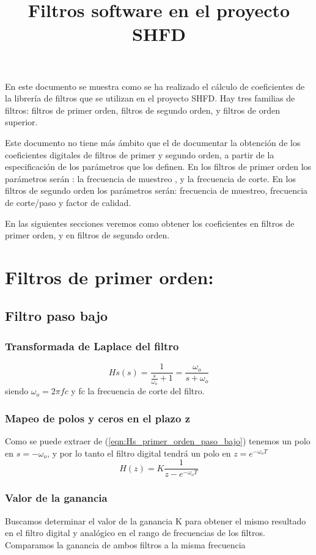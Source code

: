 \documentclass[titlepage]{article}
\title{Filtros software en el proyecto SHFD}
\date{} %
\begin{document}
\maketitle
En este documento se muestra como se ha realizado el cálculo de coeficientes de la librería de filtros que se utilizan en el proyecto SHFD. Hay tres familias de filtros: filtros de primer orden, filtros de segundo orden, y filtros de orden superior. 

Este documento no tiene más ámbito que el de documentar la obtención de los coeficientes digitales de filtros de primer y segundo orden, a partir de la especificación de los parámetros que los definen. En los filtros de primer orden los parámetros serán :  la frecuencia de muestreo , y la frecuencia de corte. En los filtros de segundo orden los parámetros serán: frecuencia de muestreo, frecuencia de corte/paso y factor de calidad.

En las siguientes secciones veremos como obtener los coeficientes en filtros de primer orden, y en filtros de segundo orden.

\section{Filtros de primer orden:}
\subsection{Filtro paso bajo}
\subsubsection{Transformada de Laplace del filtro}
\begin{equation}
\label{eqn:Hs_primer_orden_paso_bajo}Hs(s)=\frac{1}{\displaystyle\frac{s}{{\omega_o}}+1}=\frac{\displaystyle\omega_o}{s+\omega_o}
\end{equation}
\quad siendo ${\omega_o}=2{\pi}fc$  y fc la frecuencia de corte del filtro. 
\subsubsection{Mapeo de polos y ceros en el plazo z}
Como se puede extraer de (\ref{eqn:Hs_primer_orden_paso_bajo}) tenemos un polo en $s=-{\omega_o}$, y por lo tanto el filtro digital tendrá un polo en $z=e^{-\omega_oT}$ 
\begin{equation}
	H(z)=K\frac{1}{z-e^{-\omega_oT}} 
\end{equation}
\subsubsection{Valor de la ganancia}
Buscamos determinar el valor de la ganancia K para obtener el mismo resultado en el filtro digital y analógico en el rango de frecuencias de los filtros. Comparamos la ganancia de ambos filtros a la misma frecuencia  
\end{document}
